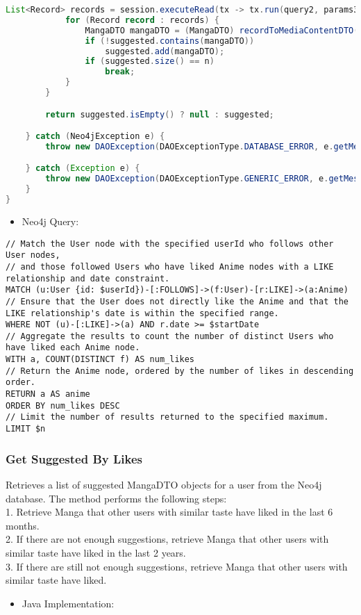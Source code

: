 \begin{mdframed}[style=customstyle]
\begin{lstlisting}[language=java]
            List<Record> records = session.executeRead(tx -> tx.run(query2, params3).list());
            for (Record record : records) {
                MangaDTO mangaDTO = (MangaDTO) recordToMediaContentDTO(record);
                if (!suggested.contains(mangaDTO))
                    suggested.add(mangaDTO);
                if (suggested.size() == n)
                    break;
            }
        }

        return suggested.isEmpty() ? null : suggested;

    } catch (Neo4jException e) {
        throw new DAOException(DAOExceptionType.DATABASE_ERROR, e.getMessage());

    } catch (Exception e) {
        throw new DAOException(DAOExceptionType.GENERIC_ERROR, e.getMessage());
    }
}\end{lstlisting}
\end{mdframed}

\begin{itemize}
    \item Neo4j Query:
\end{itemize}

\begin{mdframed}[style=customstyle]
\begin{lstlisting}[language=Cypher]
// Match the User node with the specified userId who follows other User nodes,
// and those followed Users who have liked Anime nodes with a LIKE relationship and date constraint.
MATCH (u:User {id: $userId})-[:FOLLOWS]->(f:User)-[r:LIKE]->(a:Anime)
// Ensure that the User does not directly like the Anime and that the LIKE relationship's date is within the specified range.
WHERE NOT (u)-[:LIKE]->(a) AND r.date >= $startDate
// Aggregate the results to count the number of distinct Users who have liked each Anime node.
WITH a, COUNT(DISTINCT f) AS num_likes
// Return the Anime node, ordered by the number of likes in descending order.
RETURN a AS anime
ORDER BY num_likes DESC
// Limit the number of results returned to the specified maximum.
LIMIT $n\end{lstlisting}
\end{mdframed}

\subsubsection*{Get Suggested By Likes}

Retrieves a list of suggested MangaDTO objects for a user from the Neo4j database.
The method performs the following steps:\\
1. Retrieve Manga that other users with similar taste have liked in the last 6 months.\\
2. If there are not enough suggestions, retrieve Manga that other users with similar taste have liked in the last 2 years.\\
3. If there are still not enough suggestions, retrieve Manga that other users with similar taste have liked.\\
\begin{itemize}
    \item Java Implementation:
\end{itemize}

